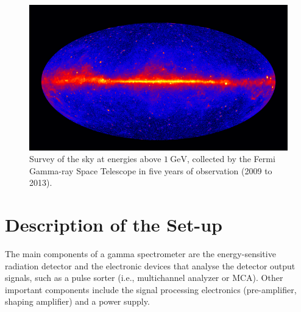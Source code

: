 \documentclass[%
 reprint,
nofootinbib,
 amsmath,amssymb,
 aps,
floatfix,
]{revtex4-2}
\begin{document}
    \begin{figure}
        \centering
        \includegraphics[scale = 0.50]{Figures/gammayrayastronomy.png}
        \caption{Survey of the sky at energies above $\SI{1}{\giga \electronvolt}$, collected by the Fermi Gamma-ray Space Telescope in five years of observation (2009 to 2013).}
        \label{fig:my_label}
    \end{figure}


\section{Description of the Set-up}
    The main components of a gamma spectrometer are the energy-sensitive radiation detector and the electronic devices that analyse the detector output signals, such as a pulse sorter (i.e., multichannel analyzer or MCA). Other important components include the signal processing electronics (pre-amplifier, shaping amplifier) and a power supply.
\end{document}
